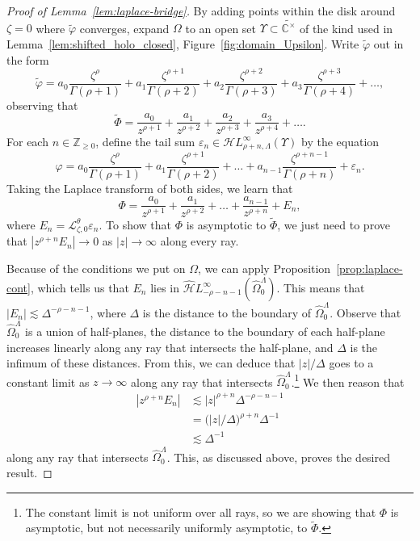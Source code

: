 \documentclass{article}
\newcommand{\singexp}[2]{\mathcal{H}L^\infty_{#1, #2}}
\newcommand{\dualsingexp}[1]{\widehat{\mathcal{H}}L^\infty_{#1}}
\newcommand{\Z}{\mathbb{Z}}
\newcommand{\C}{\mathbb{C}}
\newcommand{\series}[1]{\tilde{#1}}
\newcommand{\laplace}{\mathcal{L}}
\theoremstyle{definition}
\theoremstyle{plain}
\begin{document}
\begin{proof}[Proof of Lemma~\ref{lem:laplace-bridge}]
By adding points within the disk around $\zeta = 0$ where $\series{\varphi}$ converges, expand $\Omega$ to an open set $\Upsilon \subset \widetilde{\C^\times}$ of the kind used in Lemma~\ref{lem:shifted_holo_closed}, Figure~\ref{fig:domain_Upsilon}. Write $\series{\varphi}$ out in the form
\[ \series{\varphi} = a_0 \frac{\zeta^\rho}{\Gamma(\rho+1)} + a_1 \frac{\zeta^{\rho+1}}{\Gamma(\rho+2)} + a_2 \frac{\zeta^{\rho+2}}{\Gamma(\rho+3)} + a_3 \frac{\zeta^{\rho+3}}{\Gamma(\rho+4)} + \ldots, \]
observing that
\[ \series{\Phi} = \frac{a_0}{z^{\rho+1}} + \frac{a_1}{z^{\rho+2}} + \frac{a_2}{z^{\rho+3}} + \frac{a_3}{z^{\rho+4}} + \ldots. \]
For each $n \in \Z_{\ge 0}$, define the tail sum $\varepsilon_n \in \singexp{\rho+n}{\Lambda}(\Upsilon)$ by the equation
\[ \varphi = a_0 \frac{\zeta^\rho}{\Gamma(\rho+1)} + a_1 \frac{\zeta^{\rho+1}}{\Gamma(\rho+2)} + \ldots + a_{n-1} \frac{\zeta^{\rho+n-1}}{\Gamma(\rho+n)} + \varepsilon_n. \]
Taking the Laplace transform of both sides, we learn that
\[ \Phi = \frac{a_0}{z^{\rho+1}} + \frac{a_1}{z^{\rho+2}} + \ldots + \frac{a_{n-1}}{z^{\rho+n}} + E_n, \]
where $E_n = \laplace_{\zeta, 0}^\theta \varepsilon_n$. To show that $\Phi$ is asymptotic to $\series{\Phi}$, we just need to prove that $|z^{\rho+n} E_n| \to 0$ as $|z| \to \infty$ along every ray.

Because of the conditions we put on $\Omega$, we can apply Proposition~\ref{prop:laplace-cont}, which tells us that $E_n$ lies in $\dualsingexp{-\rho-n-1}(\widehat{\Omega}_0^\Lambda)$. This means that $|E_n| \lesssim \Delta^{-\rho-n-1}$, where $\Delta$ is the distance to the boundary of $\widehat{\Omega}_0^\Lambda$. Observe that $\widehat{\Omega}_0^\Lambda$ is a union of half-planes, the distance to the boundary of each half-plane increases linearly along any ray that intersects the half-plane, and $\Delta$ is the infimum of these distances. From this, we can deduce that $|z|/\Delta$ goes to a constant limit as $z \to \infty$ along any ray that intersects $\widehat{\Omega}_0^\Lambda$.\footnote{The constant limit is not uniform over all rays, so we are showing that $\Phi$ is asymptotic, but not necessarily uniformly asymptotic, to $\series{\Phi}$.} We then reason that
\begin{align*}
|z^{\rho+n} E_n| & \lesssim |z|^{\rho+n} \Delta^{-\rho-n-1} \\
& = \big(|z|/\Delta\big)^{\rho+n} \Delta^{-1} \\
& \lesssim \Delta^{-1}
\end{align*}
along any ray that intersects $\widehat{\Omega}_0^\Lambda$. This, as discussed above, proves the desired result.
\end{proof}
%
\end{document}
